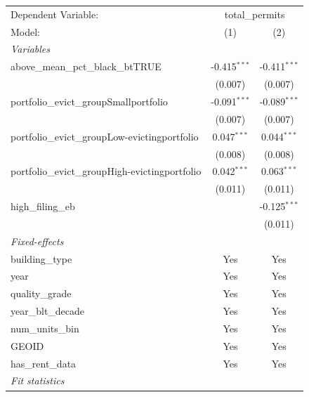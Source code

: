 \begingroup
\centering
\begin{tabular}{lcc}
   \tabularnewline \midrule \midrule
   Dependent Variable: & \multicolumn{2}{c}{total\_permits}\\
   Model:                                          & (1)            & (2)\\  
   \midrule
   \emph{Variables}\\
   above\_mean\_pct\_black\_btTRUE                 & -0.415$^{***}$ & -0.411$^{***}$\\   
                                                   & (0.007)        & (0.007)\\   
   portfolio\_evict\_groupSmallportfolio           & -0.091$^{***}$ & -0.089$^{***}$\\   
                                                   & (0.007)        & (0.007)\\   
   portfolio\_evict\_groupLow-evictingportfolio    & 0.047$^{***}$  & 0.044$^{***}$\\   
                                                   & (0.008)        & (0.008)\\   
   portfolio\_evict\_groupHigh-evictingportfolio   & 0.042$^{***}$  & 0.063$^{***}$\\   
                                                   & (0.011)        & (0.011)\\   
   high\_filing\_eb                                &                & -0.125$^{***}$\\   
                                                   &                & (0.011)\\   
   \midrule
   \emph{Fixed-effects}\\
   building\_type                                  & Yes            & Yes\\  
   year                                            & Yes            & Yes\\  
   quality\_grade                                  & Yes            & Yes\\  
   year\_blt\_decade                               & Yes            & Yes\\  
   num\_units\_bin                                 & Yes            & Yes\\  
   GEOID                                           & Yes            & Yes\\  
   has\_rent\_data                                 & Yes            & Yes\\  
   \midrule
   \emph{Fit statistics}\\

\end{tabular}
